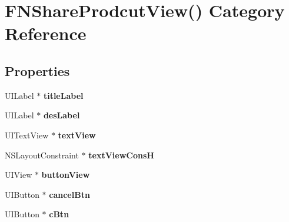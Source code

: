 \hypertarget{category_f_n_share_prodcut_view_07_08}{}\section{F\+N\+Share\+Prodcut\+View() Category Reference}
\label{category_f_n_share_prodcut_view_07_08}
\subsection*{Properties}
\begin{DoxyCompactItemize}
\item 
\mbox{\label{category_f_n_share_prodcut_view_07_08_a1487eb67e462352b6243302a8a51db89}} 
U\+I\+Label $\ast$ {\bfseries title\+Label}
\item 
\mbox{\label{category_f_n_share_prodcut_view_07_08_a87f66a56cc842c55d84f75bf0bc8cc8a}} 
U\+I\+Label $\ast$ {\bfseries des\+Label}
\item 
\mbox{\label{category_f_n_share_prodcut_view_07_08_aa0d775e3b31f117c09a8fa9fd9b31ba8}} 
U\+I\+Text\+View $\ast$ {\bfseries text\+View}
\item 
\mbox{\label{category_f_n_share_prodcut_view_07_08_af79bfd9d4f5ac48af6bf5a824e4b837b}} 
N\+S\+Layout\+Constraint $\ast$ {\bfseries text\+View\+ConsH}
\item 
\mbox{\label{category_f_n_share_prodcut_view_07_08_ab84ee4222e6278cb5728618597aae160}} 
U\+I\+View $\ast$ {\bfseries button\+View}
\item 
\mbox{\label{category_f_n_share_prodcut_view_07_08_aa328129b660306a39e1e522377d65663}} 
U\+I\+Button $\ast$ {\bfseries cancel\+Btn}
\item 
\mbox{\label{category_f_n_share_prodcut_view_07_08_aec87554ad26cc21894f3e97b0c54a20a}} 
U\+I\+Button $\ast$ {\bfseries c\+Btn}
\item 
\mbox{\label{category_f_n_share_prodcut_view_07_08_a94fc62273c940f265e2f60a3122dc610}} 

\end{DoxyCompactItemize}
